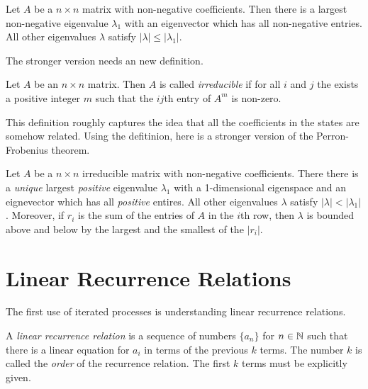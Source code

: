 \documentclass[fleqn]{report}
\begin{document}
\begin{thm}
Let $A$ be a $n\times n$ matrix with non-negative
coefficients. Then there is a largest non-negative eigenvalue
$\lambda_1$ with an eigenvector which has all non-negative
entries. All other eigenvalues $\lambda$ satisfy
$|\lambda| \leq |\lambda_1|$.
\end{thm}

The stronger version needs an new definition.

\begin{defn}
Let $A$ be an $n \times n$ matrix. Then $A$ is called
\emph{irreducible} if for all $i$ and $j$ the exists a
positive integer $m$ such that the $ij$th entry of $A^m$ is
non-zero.
\end{defn}

This definition roughly captures the idea that all the
coefficients in the states are somehow related. Using the
defitinion, here is a stronger version of the Perron-Frobenius
theorem.

\begin{thm}
Let $A$ be a $n \times n$ irreducible matrix with non-negative
coefficients. There there is a \emph{unique} largest
\emph{positive} eigenvalue $\lambda_1$ with a 1-dimensional
eigenspace and an eignevector which has all \emph{positive}
entires. All other eigenvalues $\lambda$ satisfy $|\lambda| <
|\lambda_1|$. Moreover, if $r_i$ is the sum of the entries of
$A$ in the $i$th row, then $\lambda$ is bounded above and
below by the largest and the smallest of the $|r_i|$. 
\end{thm} 

\section{Linear Recurrence Relations}

The first use of iterated processes is understanding linear
recurrence relations.

\begin{defn}
A \emph{linear recurrence relation} is a sequence of numbers
$\{a_n\}$ for $n \in \mathbb{N}$ such that there is a linear equation
for $a_i$ in terms of the previous $k$ terms. The
number $k$ is called the \emph{order} of the
recurrence relation. The first $k$ terms must be explicitly
given.

\end{defn}
\end{document}
